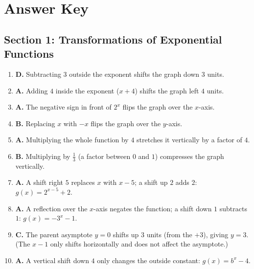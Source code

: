 \documentclass[11pt]{article}
\begin{document}
\newpage
\section*{Answer Key}

\subsection*{Section 1: Transformations of Exponential Functions}
\begin{enumerate}[leftmargin=1.5em, itemsep=6pt]
  \item \textbf{D.} Subtracting $3$ outside the exponent shifts the graph down $3$ units.
  \item \textbf{A.} Adding $4$ inside the exponent ($x+4$) shifts the graph left $4$ units.
  \item \textbf{A.} The negative sign in front of $2^x$ flips the graph over the $x$-axis.
  \item \textbf{B.} Replacing $x$ with $-x$ flips the graph over the $y$-axis.
  \item \textbf{A.} Multiplying the whole function by $4$ stretches it vertically by a factor of $4$.
  \item \textbf{B.} Multiplying by $\tfrac13$ (a factor between $0$ and $1$) compresses the graph vertically.
  \item \textbf{A.} A shift right $5$ replaces $x$ with $x-5$; a shift up $2$ adds $2$: $g(x)=2^{x-5}+2$.
  \item \textbf{A.} A reflection over the $x$-axis negates the function; a shift down $1$ subtracts $1$: $g(x)=-3^x-1$.
  \item \textbf{C.} The parent asymptote $y=0$ shifts up $3$ units (from the $+3$), giving $y=3$. (The $x-1$ only shifts horizontally and does not affect the asymptote.)
  \item \textbf{A.} A vertical shift down $4$ only changes the outside constant: $g(x)=b^x-4$.
\end{enumerate}
\end{document}
